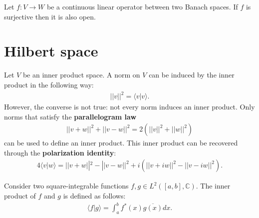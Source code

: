     \begin{theorem}
        Let $f:V\rightarrow W$ be a continuous linear operator between two Banach spaces. If $f$ is surjective then it is also open.
    \end{theorem}

\section{Hilbert space}

    \begin{remark}
        Let $V$ be an inner product space. A norm on $V$ can be induced by the inner product in the following way:
        \begin{gather}
        \label{linalgebra:inner_product:norm}
        ||v||^2 = \langle v|v \rangle.
        \end{gather}
        However, the converse is not true: not every norm induces an inner product. Only norms that satisfy the \textbf{parallelogram law}
        \begin{gather}
            \label{linalgebra:parallellogram_law}
            ||v+w||^2 + ||v-w||^2 = 2(||v||^2 + ||w||^2)
        \end{gather}
        can be used to define an inner product. This inner product can be recovered through the \textbf{polarization identity}:
        \begin{gather}
            \label{linalgebra:polarization_identity}
            4 \langle v|w \rangle = ||v+w||^2 - ||v-w||^2 + i\left(||v+iw||^2 - ||v-iw||^2\right).
        \end{gather}
    \end{remark}


    \begin{example}
        Consider two square-integrable functions $f,g\in L^2([a,b], \mathbb{C})$. The inner product of $f$ and $g$ is defined as follows:
        \begin{gather}
            \label{hilbert:inner_product_L2}
            \langle f|g\rangle = \int_a^bf^*(x)\overline{g(x)}dx.
        \end{gather}
    \end{example}

